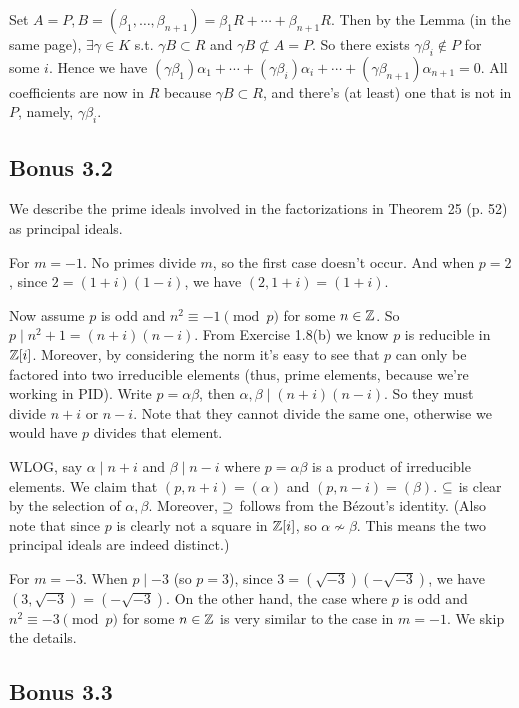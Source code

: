 \documentclass[../Marcus.tex]{subfiles}
\begin{document}
Set $A=P,B=(\beta_1,\ldots,\beta_{n+1})=\beta_1R+\cdots+\beta_{n+1}R$. Then by the Lemma (in the same page), $\exists \gamma\in K$ s.t. $\gamma B\subset R$ and $\gamma B\not\subset A=P$. So there exists $\gamma\beta_i\notin P$ for some $i$. Hence we have $(\gamma\beta_1)\alpha_1+\cdots+(\gamma\beta_i)\alpha_i+\cdots+(\gamma\beta_{n+1})\alpha_{n+1}=0$. All coefficients are now in $R$ because $\gamma B\subset R$, and there's (at least) one that is not in $P$, namely, $\gamma\beta_i$.

\subsection*{Bonus 3.2}

We describe the prime ideals involved in the factorizations in Theorem 25 (p. 52) as principal ideals.

For $m=-1$. No primes divide $m$, so the first case doesn't occur. And when $p=2$, since $2=(1+i)(1-i)$, we have $(2,1+i)=(1+i)$.

Now assume $p$ is odd and $n^2\equiv -1 \pmod{p}$ for some $n\in\mathbb{Z}$. So $p\mid n^2+1=(n+i)(n-i)$. From Exercise 1.8(b) we know $p$ is reducible in $\mathbb{Z}[i]$. Moreover, by considering the norm it's easy to see that $p$ can only be factored into two irreducible elements (thus, prime elements, because we're working in PID). Write $p=\alpha\beta$, then $\alpha,\beta\mid(n+i)(n-i)$. So they must divide $n+i$ or $n-i$. Note that they cannot divide the same one, otherwise we would have $p$ divides that element.

WLOG, say $\alpha\mid n+i$ and $\beta\mid n-i$ where $p=\alpha\beta$ is a product of irreducible elements. We claim that $(p,n+i)=(\alpha)$ and $(p,n-i)=(\beta)$. $\subseteq$ is clear by the selection of $\alpha,\beta$. Moreover, $\supseteq$ follows from the Bézout's identity. (Also note that since $p$ is clearly not a square in $\mathbb{Z}[i]$, so $\alpha\nsim\beta$. This means the two principal ideals are indeed distinct.)

For $m=-3$. When $p\mid -3$ (so $p=3$), since $3=(\sqrt{-3})(-\sqrt{-3})$, we have $(3,\sqrt{-3})=(-\sqrt{-3})$. On the other hand, the case where $p$ is odd and $n^2\equiv -3 \pmod{p}$ for some $n\in\mathbb{Z}$ is very similar to the case in $m=-1$. We skip the details.

\subsection*{Bonus 3.3}
\end{document}
